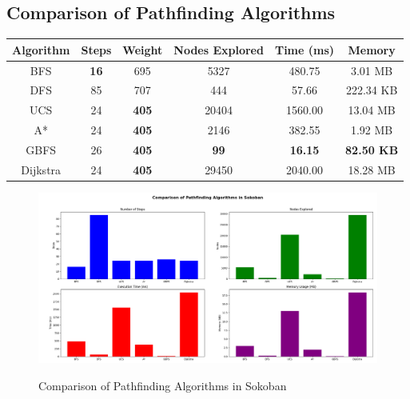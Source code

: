 \subsection{Comparison of Pathfinding Algorithms}

\begin{table}[h]
    \centering
    \begin{tabular}{|c|c|c|c|c|c|}
        \hline
        \textbf{Algorithm} & \textbf{Steps} & \textbf{Weight} & \textbf{Nodes Explored} & \textbf{Time (ms)} & \textbf{Memory} \\
        \hline
        BFS & \textbf{16} & 695 & 5327 & 480.75 & 3.01 MB \\
        \hline
        DFS & 85 & 707 & 444 & 57.66 & 222.34 KB \\
        \hline
        UCS & 24 & \textbf{405} & 20404 & 1560.00 & 13.04 MB \\
        \hline
        A* & 24 & \textbf{405} & 2146 & 382.55 & 1.92 MB \\
        \hline
        GBFS & 26 & \textbf{405} & \textbf{99} & \textbf{16.15} & \textbf{82.50 KB} \\
        \hline
        Dijkstra & 24 & \textbf{405} & 29450 & 2040.00 & 18.28 MB \\
        \hline
    \end{tabular}
    \label{tab:sokoban_comparison}
\end{table}

\begin{figure}[H]
    \centering
    \includegraphics[width=\textwidth]{imgs/bar_graph.png}
    \label{fig:sokoban_comparison}
    \caption{Comparison of Pathfinding Algorithms in Sokoban}
\end{figure}

